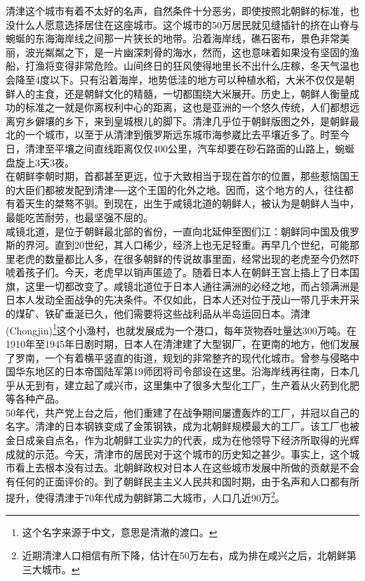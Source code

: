 \ifnum{}
	\begin{multicols}{\theparacolNo}
\fi
清津这个城市有着不太好的名声，自然条件十分恶劣，即使按照北朝鲜的标准，也没什么人愿意选择居住在这座城市。这个城市的50万居民就见缝插针的挤在山脊与蜿蜒的东海海岸线之间那一片狭长的地带。沿着海岸线，礁石密布，景色非常美丽，波光粼粼之下，是一片幽深刺骨的海水，然而，这也意味着如果没有坚固的渔船，打渔将变得非常危险。山间终日的狂风使得地里长不出什么庄稼，冬天气温也会降至4度以下。只有沿着海岸，地势低洼的地方可以种植水稻，大米不仅仅是朝鲜人的主食，还是朝鲜文化的精髓，一切都围绕大米展开。历史上，朝鲜人衡量成功的标准之一就是你离权利中心的距离，这也是亚洲的一个悠久传统，人们都想远离穷乡僻壤的乡下，来到皇城根儿的脚下。清津几乎位于朝鲜版图之外，是朝鲜最北的一个城市，以至于从清津到俄罗斯远东城市海参崴比去平壤近多了。时至今日，清津至平壤之间直线距离仅仅400公里，汽车却要在砂石路面的山路上，蜿蜒盘旋上3天3夜。\\

在朝鲜李朝时期，首都甚至更远，位于大致相当于现在首尔的位置，那些惹恼国王的大臣们都被发配到清津──这个王国的化外之地。因而，这个地方的人，往往都有着天生的桀骜不驯。到现在，出生于咸镜北道的朝鲜人，被认为是朝鲜人当中，最能吃苦耐劳，也最坚强不屈的。\\

咸镜北道，是位于朝鲜最北部的省份，一直向北延伸至图们江：朝鲜同中国及俄罗斯的界河。直到20世纪，其人口稀少，经济上也无足轻重。再早几个世纪，可能那里老虎的数量都比人多，在很多朝鲜的传说故事里面，经常出现的老虎至今仍然吓唬着孩子们。今天，老虎早以销声匿迹了。随着日本人在朝鲜王宫上插上了日本国旗，这里一切都改变了。咸镜北道位于日本人通往满洲的必经之地，而占领满洲是日本人发动全面战争的先决条件。不仅如此，日本人还对位于茂山一带几乎未开采的煤矿、铁矿垂涎已久，他们需要将这些战利品从半岛运回日本。清津(Chongjin)\footnote{这个名字来源于中文，意思是清澈的渡口。}这个小渔村，也就发展成为一个港口，每年货物吞吐量达300万吨。在1910年至1945年日剧时期，日本人在清津建了大型钢厂，在更南的地方，他们发展了罗南，一个有着横平竖直的街道，规划的非常整齐的现代化城市。曾参与侵略中国华东地区的日本帝国陆军第19师团将司令部设在这里。沿海岸线再往南，日本几乎从无到有，建立起了咸兴市，这里集中了很多大型化工厂，生产着从火药到化肥等各种产品。\\

50年代，共产党上台之后，他们重建了在战争期间屡遭轰炸的工厂，并冠以自己的名字。清津的日本钢铁变成了金策钢铁，成为北朝鲜规模最大的工厂。该工厂也被金日成亲自点名，作为北朝鲜工业实力的代表，成为在他领导下经济所取得的光辉成就的示范。今天，清津市的居民对于这个城市的历史知之甚少。事实上，这个城市看上去根本没有过去。北朝鲜政权对日本人在这些城市发展中所做的贡献是不会有任何的正面评价的。到了朝鲜民主主义人民共和国时期，由于名声和人口都有所提升，使得清津于70年代成为朝鲜第二大城市，人口几近90万\footnote{近期清津人口相信有所下降，估计在50万左右，成为排在咸兴之后，北朝鲜第三大城市。}。\\


\end{multicols}
